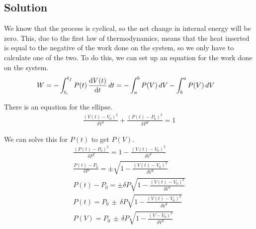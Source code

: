 \documentclass[12pt]{article}
\begin{document}
        \subsection{Solution}
            We know that the process is cyclical, so the net change in internal energy will be zero. 
            This, due to the first law of thermodynamics, means that the heat inserted is equal to the negative of the work done on the system, so we only have to calculate one of the two.
            To do this, we can set up an equation for the work done on the system.
            \begin{align}
                W   &=  -\int_{t_i}^{t_f} P(t)\,\dv{V(t)}{t}\,dt
                    =   -\int_{a}^{b} P(V)\,dV - \int_{b}^{a} P(V)\,dV
            \end{align}

            There is an equation for the ellipse.
            \begin{gather}
                \frac{\left( V(t) - V_0 \right)^2}{\delta V^2} + \frac{\left( P(t) - P_0 \right)^2}{\delta P^2} = 1
            \end{gather}

            We can solve this for $P(t)$ to get $P(V)$.
            \begin{gather}
                \frac{\left( P(t) - P_0 \right)^2}{\delta P^2} = 1 - \frac{\left( V(t) - V_0 \right)^2}{\delta V^2}\\
                \frac{P(t) - P_0}{\delta P} = \pm \sqrt{ 1 - \frac{\left( V(t) - V_0 \right)^2}{\delta V^2} }\\
                P(t) - P_0 = \pm \delta P \sqrt{ 1 - \frac{\left( V(t) - V_0 \right)^2}{\delta V^2} }\\
                P(t) = P_0\,\pm\,\delta P \sqrt{ 1 - \frac{\left( V(t) - V_0 \right)^2}{\delta V^2} }\\
                P(V) = P_0\,\pm\,\delta P \sqrt{ 1 - \frac{\left( V - V_0 \right)^2}{\delta V^2} }
            \end{gather}
\end{document}
